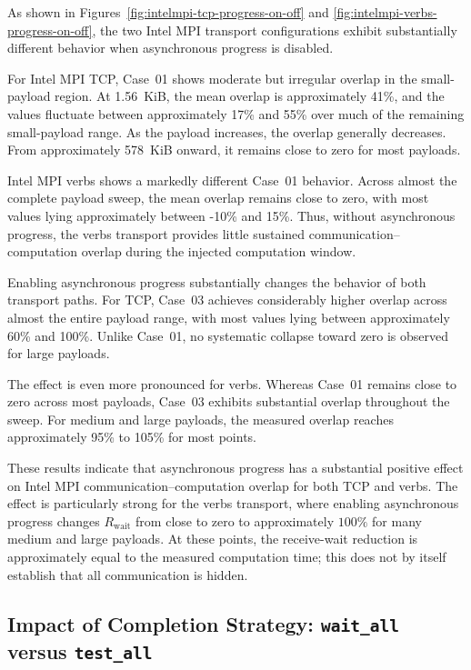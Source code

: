 As shown in Figures~\ref{fig:intelmpi-tcp-progress-on-off} and
\ref{fig:intelmpi-verbs-progress-on-off}, the two Intel MPI transport
configurations exhibit substantially different behavior when asynchronous
progress is disabled.

For Intel MPI TCP, Case~01 shows moderate but irregular overlap in the
small-payload region. At 1.56~KiB, the mean overlap is approximately
41\%, and the values fluctuate between approximately 17\% and 55\% over
much of the remaining small-payload range. As the payload increases, the
overlap generally decreases. From approximately 578~KiB onward, it remains
close to zero for most payloads.

Intel MPI verbs shows a markedly different Case~01 behavior. Across almost
the complete payload sweep, the mean overlap remains close to zero, with
most values lying approximately between -10\% and 15\%. Thus, without
asynchronous progress, the verbs transport provides little sustained
communication--computation overlap during the injected computation window.

Enabling asynchronous progress substantially changes the behavior of both
transport paths. For TCP, Case~03 achieves considerably higher overlap
across almost the entire payload range, with most values lying between
approximately 60\% and 100\%. Unlike Case~01, no systematic collapse toward
zero is observed for large payloads.

The effect is even more pronounced for verbs. Whereas Case~01 remains close
to zero across most payloads, Case~03 exhibits substantial overlap throughout
the sweep. For medium and large payloads, the measured overlap reaches
approximately 95\% to 105\% for most points.

These results indicate that asynchronous progress has a substantial positive
effect on Intel MPI communication--computation overlap for both TCP and verbs.
The effect is particularly strong for the verbs transport, where enabling
asynchronous progress changes $R_{\mathrm{wait}}$ from close to zero to
approximately $100\%$ for many medium and large payloads. At these points,
the receive-wait reduction is approximately equal to the measured computation
time; this does not by itself establish that all communication is hidden.


\subsection{Impact of Completion Strategy: \texttt{wait\_all} versus \texttt{test\_all}}
\label{sec:completion-methods}

